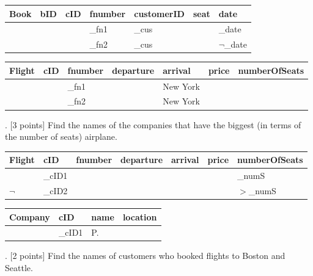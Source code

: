 \documentclass[]{article}
\begin{document}
	\begin{table}[H]
		\begin{tabular}{|l|l|l|l|l|l|l|}
			\hline
			Book & bID & cID & fnumber & customerID & seat & date \\ \hline
				 &     &     & \_fn1   &  \_cus	    & 	   & \_date 	  \\ \hline
				 &     &     & \_fn2   &  \_cus	    & 	   & $\neg$\_date 	  \\ \hline
		\end{tabular}
	\end{table}

	\begin{table}[H]
		\begin{tabular}{|l|l|l|l|l|l|l|}
			\hline
			Flight & cID & fnumber & departure & arrival & price & numberOfSeats \\ \hline
				   &  	 &  \_fn1  &  		   & New York &  	 &  			 \\ \hline
			 	   &  	 &  \_fn2  &  		   & New York &  	 &  			 \\ \hline
		\end{tabular}
	\end{table}
	
	. [3 points] Find the names of the companies that have the biggest (in terms of the number of seats) airplane.  \\
	
	\begin{table}[H]
		\begin{tabular}{|l|l|l|l|l|l|l|}
			\hline
			Flight & cID & fnumber & departure & arrival & price & numberOfSeats \\ \hline
				   & \_cID1  &  		&  			&  		&  		 &  	\_numS		 \\ \hline
			$\neg$ & \_cID2  &  		&  			&  		&  		 &  	$>$\_numS		 \\ \hline
		\end{tabular}
	\end{table}
	
	\begin{table}[H]
		\begin{tabular}{|l|l|l|l|}
			\hline
			Company & cID & name & location \\ \hline
					& \_cID1 &  P. &  		\\ \hline
		\end{tabular}
	\end{table}
	
	. [2 points] Find the names of customers who booked flights to Boston and Seattle.  \\
	
\end{document}
